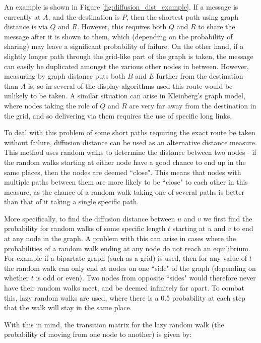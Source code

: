 \documentclass[bsc,frontabs,twoside,singlespacing,parskip,deptreport]{infthesis}     %
\begin{document}
An example is shown in Figure \ref{fig:diffusion_dist_example}. If a message is currently at $A$, and the destination is $P$, then the shortest path using graph distance is via $Q$ and $R$. However, this requires both $Q$ and $R$ to share the message after it is shown to them, which (depending on the probability of sharing) may leave a significant probability of failure. On the other hand, if a slightly longer path through the grid-like part of the graph is taken, the message can easily be duplicated amongst the various other nodes in between. However, measuring by graph distance puts both $B$ and $E$ further from the destination than $A$ is, so in several of the display algorithms used this route would be unlikely to be taken. A similar situation can arise in Kleinberg's graph model, where nodes taking the role of $Q$ and $R$ are very far away from the destination in the grid, and so delivering via them requires the use of specific long links.

To deal with this problem of some short paths requiring the exact route be taken without failure, diffusion distance can be used as an alternative distance measure. This method uses random walks to determine the distance between two nodes - if the random walks starting at either node have a good chance to end up in the same places, then the nodes are deemed ``close". This means that nodes with multiple paths between them are more likely to be ``close" to each other in this measure, as the chance of a random walk taking one of several paths is better than that of it taking a single specific path.

More specifically, to find the diffusion distance between $u$ and $v$ we first find the probability for random walks of some specific length $t$ starting at $u$ and $v$ to end at any node in the graph. A problem with this can arise in cases where the probabilities of a random walk ending at any node do not reach an equilibrium. For example if a bipartate graph (such as a grid) is used, then for any value of $t$ the random walk can only end at nodes on one ``side" of the graph (depending on whether $t$ is odd or even). Two nodes from opposite ``sides" would therefore never have their random walks meet, and be deemed infinitely far apart. To combat this, lazy random walks are used, where there is a 0.5 probability at each step that the walk will stay in the same place.

With this in mind, the transition matrix for the lazy random walk (the probability of moving from one node to another) is given by:
\end{document}
